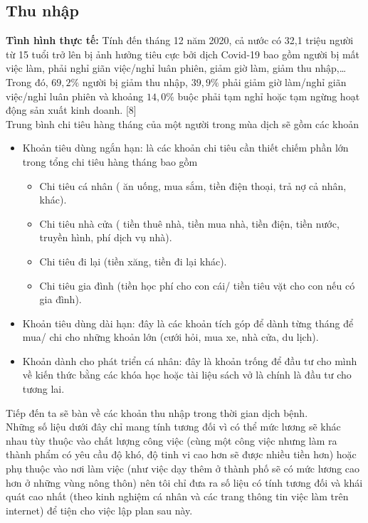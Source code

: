 \subsection{Thu nhập}
\textbf{Tình hình thực tế:}
Tính đến tháng 12 năm 2020, cả nước có 32,1 triệu người từ 15 tuổi trở lên bị ảnh hưởng tiêu cực bởi dịch Covid-19 bao gồm người bị mất việc làm, phải nghỉ giãn việc/nghỉ luân phiên, giảm giờ làm, giảm thu nhập,… Trong đó, $69,2 \%$ người bị giảm thu nhập, $39,9 \%$ phải giảm giờ làm/nghỉ giãn việc/nghỉ luân phiên và khoảng $14,0 \%$ buộc phải tạm nghỉ hoặc tạm ngừng hoạt động sản xuất kinh doanh. [8]\\
Trung bình chi tiêu hàng tháng của một người trong mùa dịch sẽ gồm các khoản
\begin{itemize}
    \item Khoản tiêu dùng ngắn hạn: là các khoản chi tiêu cần thiết chiếm phần lớn trong tổng chi tiêu hàng tháng bao gồm
    \begin{itemize}
        \item Chi tiêu cá nhân ( ăn uống, mua sắm, tiền điện thoại, trả nợ cả nhân, khác).
        \item Chi tiêu nhà cửa ( tiền thuê nhà, tiền mua nhà, tiền điện, tiền nước, truyền hình, phí dịch vụ nhà).
        \item Chi tiêu đi lại (tiền xăng, tiền đi lại khác).
        \item Chi tiêu gia đình (tiền học phí cho con cái/ tiền tiêu vặt cho con nếu có gia đình).
    \end{itemize}
    \item Khoản tiêu dùng dài hạn: đây là các khoản tích góp để dành từng tháng để mua/ chi cho những khoản lớn (cưới hỏi, mua xe, nhà cửa, du lịch).
    \item Khoản dành cho phát triển cá nhân: đây là khoản trống để đầu tư cho mình về kiến thức bằng các khóa học hoặc tài liệu sách vở là chính là đầu tư cho tương lai.
\end{itemize}
Tiếp đến ta sẽ bàn về các khoản thu nhập trong thời gian dịch bệnh.\\
Những số liệu dưới đây chỉ mang tính tương đối vì có thể mức lương sẽ khác nhau tùy thuộc vào chất lượng công việc (cùng một công việc nhưng làm ra thành phẩm có yêu cầu độ khó, độ tinh vi cao hơn sẽ được nhiều tiền hơn) hoặc phụ thuộc vào nơi làm việc (như việc dạy thêm ở thành phố sẽ có mức lương cao hơn ở những vùng nông thôn) nên tôi chỉ đưa ra số liệu có tính tương đối và khái quát cao nhất (theo kinh nghiệm cá nhân và các trang thông tin việc làm trên internet) để tiện cho việc lập plan sau này.
